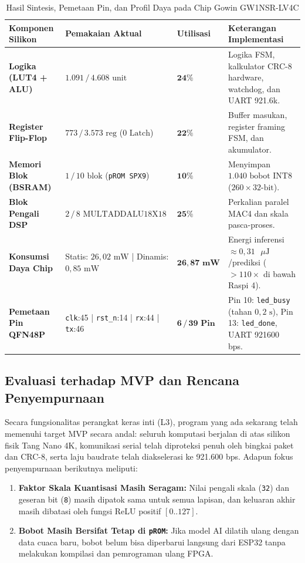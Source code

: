 \documentclass[12pt,a4paper]{article}
\begin{document}
\begin{table}[h!]
\centering
\small
{}
\caption{Hasil Sintesis, Pemetaan Pin, dan Profil Daya pada Chip Gowin GW1NSR-LV4C}
\label{tab:resource_usage}
\begin{tabularx}{\textwidth}{p{3.8cm}p{4.0cm}p{2.2cm}X}
\toprule
\textbf{Komponen Silikon} & \textbf{Pemakaian Aktual} & \textbf{Utilisasi} & \textbf{Keterangan Implementasi} \\
\midrule
\textbf{Logika (LUT4 + ALU)} & $1.091 \, / \, 4.608\text{ unit}$ & $\mathbf{24\%}$ & Logika FSM, kalkulator CRC-8 hardware, watchdog, dan UART 921.6k. \\
\textbf{Register Flip-Flop} & $773 \, / \, 3.573\text{ reg}$ ($0\text{ Latch}$) & $\mathbf{22\%}$ & Buffer masukan, register framing FSM, dan akumulator. \\
\textbf{Memori Blok (BSRAM)} & $1 \, / \, 10\text{ blok}$ (\texttt{pROM SPX9}) & $\mathbf{10\%}$ & Menyimpan $1.040\text{ bobot INT8}$ ($260 \times 32\text{-bit}$). \\
\textbf{Blok Pengali DSP} & $2 \, / \, 8\text{ MULTADDALU18X18}$ & $\mathbf{25\%}$ & Perkalian paralel MAC4 dan skala pasca-proses. \\
\textbf{Konsumsi Daya Chip} & Statis: $26{,}02\text{ mW}$ | Dinamis: $0{,}85\text{ mW}$ & $\mathbf{26{,}87\text{ mW}}$ & Energi inferensi $\approx 0{,}31\text{ }\mu\text{J}$/prediksi ($>110\times$ di bawah Raspi 4). \\
\textbf{Pemetaan Pin QFN48P} & \texttt{clk}:45 | \texttt{rst\_n}:14 | \texttt{rx}:44 | \texttt{tx}:46 & $\mathbf{6 \, / \, 39\text{ Pin}}$ & Pin 10: \texttt{led\_busy} (tahan $0{,}2\text{ s}$), Pin 13: \texttt{led\_done}, UART 921600 bps. \\
\bottomrule
\end{tabularx}
\end{table}

\subsection{Evaluasi terhadap MVP dan Rencana Penyempurnaan}
Secara fungsionalitas perangkat keras inti (L3), program yang ada sekarang telah memenuhi target MVP secara andal: seluruh komputasi berjalan di atas silikon fisik Tang Nano 4K, komunikasi serial telah diproteksi penuh oleh bingkai paket dan CRC-8, serta laju baudrate telah diakselerasi ke 921.600 bps. Adapun fokus penyempurnaan berikutnya meliputi:
\begin{enumerate}[leftmargin=0.7cm, itemsep=2pt]
    \item \textbf{Faktor Skala Kuantisasi Masih Seragam:} Nilai pengali skala (\texttt{32}) dan geseran bit (\texttt{8}) masih dipatok sama untuk semua lapisan, dan keluaran akhir masih dibatasi oleh fungsi ReLU positif $[0..127]$.
    \item \textbf{Bobot Masih Bersifat Tetap di \texttt{pROM}:} Jika model AI dilatih ulang dengan data cuaca baru, bobot belum bisa diperbarui langsung dari ESP32 tanpa melakukan kompilasi dan pemrograman ulang FPGA.
\end{enumerate}
\end{document}
